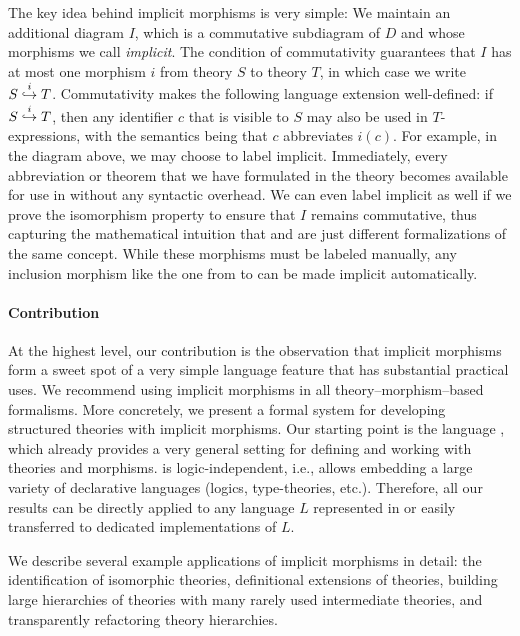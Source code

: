 The key idea behind implicit morphisms is very simple:
We maintain an additional diagram $I$, which is a commutative subdiagram of $D$ and whose morphisms we call \emph{implicit}.
The condition of commutativity guarantees that $I$ has at most one morphism $i$ from theory $S$ to theory $T$, in which case we write $\ipc{i}{S}{T}$.
Commutativity makes the following language extension well-defined: if $\ipc{i}{S}{T}$, then any identifier $c$ that is visible to $S$ may also be used in $T$-expressions, with the semantics being that $c$ abbreviates $i(c)$.
For example, in the diagram above, we may choose to label  implicit.
Immediately, every abbreviation or theorem that we have formulated in the theory  becomes available for use in  without any syntactic overhead.
We can even label  implicit as well if we prove the isomorphism property to ensure that $I$ remains commutative, thus capturing the mathematical intuition that  and  are just different formalizations of the same concept.
While these morphisms must be labeled manually, any inclusion morphism like the one from  to  can be made implicit automatically.

\paragraph{Contribution}
At the highest level, our contribution is the observation that implicit morphisms form a sweet spot of a very simple language feature that has substantial practical uses.
We recommend using implicit morphisms in all theory--morphism--based formalisms.
More concretely, we present a formal system for developing structured theories with implicit morphisms.
Our starting point is the \mmt language \cite{RK:mmt:10}, which already provides a very general setting for defining and working with theories and morphisms.
\mmt is logic-independent, i.e., allows embedding a large variety of declarative languages (logics, type-theories, etc.).
Therefore, all our results can be directly applied to any language $L$ represented in \mmt or easily transferred to dedicated implementations of $L$.

We describe several example applications of implicit morphisms in detail: the identification of isomorphic theories, definitional extensions of theories, building large hierarchies of theories with many rarely used intermediate theories, and transparently refactoring theory hierarchies.

